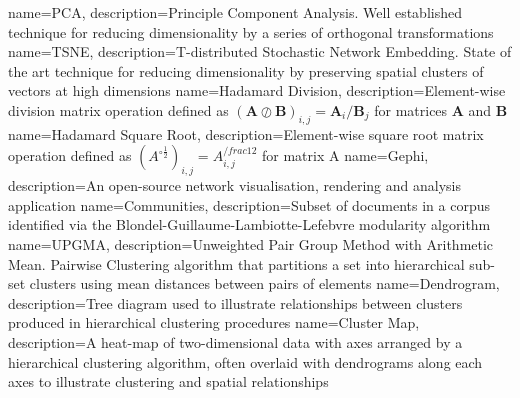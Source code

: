{
name={PCA},
description={Principle Component Analysis. Well established technique for reducing dimensionality by a series of orthogonal transformations \cite{PCA}} 
}
{
name={TSNE},
description={T-distributed Stochastic Network Embedding. State of the art technique for reducing dimensionality by preserving spatial clusters of vectors at high dimensions \cite{TSNE}} 
}
{
name={Hadamard Division},
description={Element-wise division matrix operation defined as $\left( \mathbf{A} \oslash \mathbf{B} \right)_{i , j} = \mathbf{A}_i / \mathbf{B}_j  $ for matrices $\mathbf{A}$ and $\mathbf{B}$} 
}
{
name={Hadamard Square Root},
description={Element-wise square root matrix operation defined as $\left( A^{\circ\frac{1}{2}} \right)_{i , j} = A_{i , j}^{/frac{1}{2}} $ for matrix A} 
}
{
name={Gephi},
description={An open-source network visualisation, rendering and analysis application} 
}
{
name={Communities},
description={Subset of documents in a corpus identified via the Blondel-Guillaume-Lambiotte-Lefebvre modularity algorithm \cite{modularity1}\cite{modularity2}} 
}
{
name={UPGMA},
description={Unweighted Pair Group Method with Arithmetic Mean. Pairwise Clustering algorithm that partitions a set into hierarchical sub-set clusters using mean distances between pairs of elements \cite{heatmapcluster}} 
}
{
name={Dendrogram},
description={Tree diagram used to illustrate relationships between clusters produced in hierarchical clustering procedures \cite{dendrogram}} 
}
{
name={Cluster Map},
description={A heat-map of two-dimensional data with axes arranged by a hierarchical clustering algorithm, often overlaid with dendrograms along each axes to illustrate clustering and spatial relationships \cite{dendrogram} \cite{seaborn} \cite{scipy}} 
}